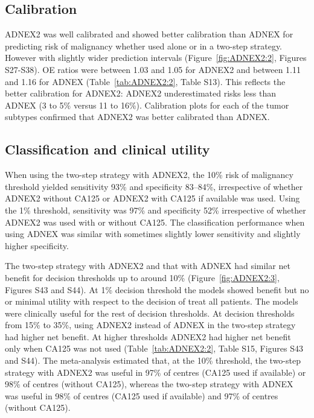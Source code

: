 \subsection{Calibration}

ADNEX2 was well calibrated and showed better calibration than \gls{ADNEX} for predicting risk of malignancy whether used alone or in a two-step strategy. However with slightly wider prediction intervals (Figure~\ref{fig:ADNEX2:2}, Figures S27-S38). \gls{OE} ratios were between 1.03 and 1.05 for ADNEX2 and between 1.11 and 1.16 for \gls{ADNEX} (Table~\ref{tab:ADNEX2:2}, Table S13). This reflects the better calibration for ADNEX2: ADNEX2 underestimated risks less than \gls{ADNEX} (3 to 5\% versus 11 to 16\%). Calibration plots for each of the tumor subtypes confirmed that ADNEX2 was better calibrated than \gls{ADNEX}.

\subsection{Classification and clinical utility}

When using the two-step strategy with ADNEX2, the 10\% risk of malignancy threshold yielded sensitivity 93\% and specificity 83--84\%, irrespective of whether ADNEX2 without \gls{CA125} or ADNEX2 with \gls{CA125} if available was used. Using the 1\% threshold, sensitivity was 97\% and specificity 52\% irrespective of whether ADNEX2 was used with or without \gls{CA125}. The classification performance when using \gls{ADNEX} was similar with sometimes slightly lower sensitivity and slightly higher specificity.

The two-step strategy with ADNEX2 and that with \gls{ADNEX} had similar net benefit for decision thresholds up to around 10\% (Figure~\ref{fig:ADNEX2:3}, Figures S43 and S44). At 1\% decision threshold the models showed benefit but no or minimal utility with respect to the decision of treat all patients. The models were clinically useful for the rest of decision thresholds. At decision thresholds from 15\% to 35\%, using ADNEX2 instead of \gls{ADNEX} in the two-step strategy had higher net benefit. At higher thresholds ADNEX2 had higher net benefit only when \gls{CA125} was not used (Table~\ref{tab:ADNEX2:2}, Table S15, Figures S43 and S44). The meta-analysis estimated that, at the 10\% threshold, the two-step strategy with ADNEX2 was useful in 97\% of centres (\gls{CA125} used if available) or 98\% of centres (without \gls{CA125}), whereas the two-step strategy with \gls{ADNEX} was useful in 98\% of centres (\gls{CA125} used if available) and 97\% of centres (without \gls{CA125}).

